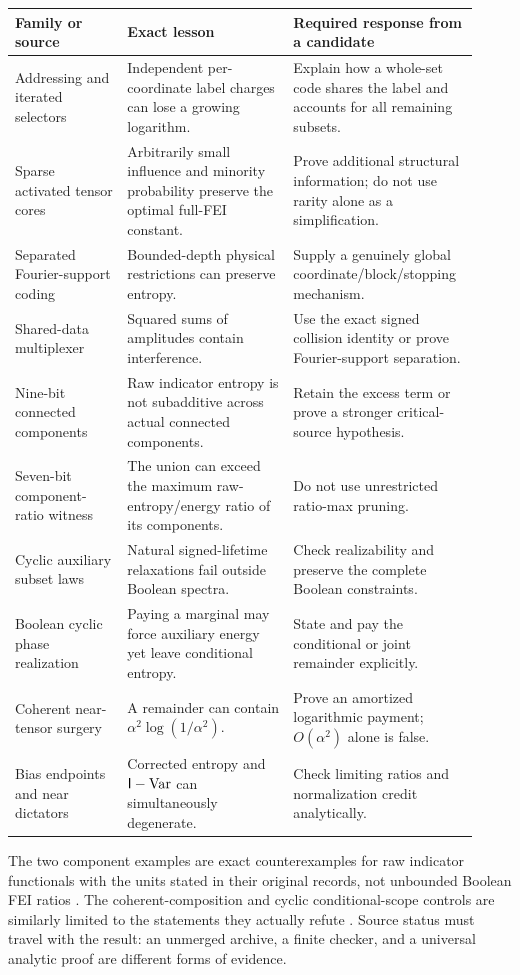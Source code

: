 \documentclass[11pt]{article}
\newcommand{\Var}{\operatorname{Var}}\newcommand{\wh}[1]{\widehat{#1}}
\begin{document}
\begin{longtable}{>{\raggedright\arraybackslash}p{0.23\linewidth}>{\raggedright\arraybackslash}p{0.34\linewidth}>{\raggedright\arraybackslash}p{0.35\linewidth}}
\toprule
Family or source & Exact lesson & Required response from a candidate \\
\midrule\endhead
Addressing and iterated selectors & Independent per-coordinate label charges can lose a growing logarithm. & Explain how a whole-set code shares the label and accounts for all remaining subsets. \\
Sparse activated tensor cores & Arbitrarily small influence and minority probability preserve the optimal full-FEI constant. & Prove additional structural information; do not use rarity alone as a simplification. \\
Separated Fourier-support coding & Bounded-depth physical restrictions can preserve entropy. & Supply a genuinely global coordinate/block/stopping mechanism. \\
Shared-data multiplexer & Squared sums of amplitudes contain interference. & Use the exact signed collision identity or prove Fourier-support separation. \\
Nine-bit connected components & Raw indicator entropy is not subadditive across actual connected components. & Retain the excess term or prove a stronger critical-source hypothesis. \\
Seven-bit component-ratio witness & The union can exceed the maximum raw-entropy/energy ratio of its components. & Do not use unrestricted ratio-max pruning. \\
Cyclic auxiliary subset laws & Natural signed-lifetime relaxations fail outside Boolean spectra. & Check realizability and preserve the complete Boolean constraints. \\
Boolean cyclic phase realization & Paying a marginal may force auxiliary energy yet leave conditional entropy. & State and pay the conditional or joint remainder explicitly. \\
Coherent near-tensor surgery & A remainder can contain $\alpha^2\log(1/\alpha^2)$. & Prove an amortized logarithmic payment; $O(\alpha^2)$ alone is false. \\
Bias endpoints and near dictators & Corrected entropy and $\I-\Var$ can simultaneously degenerate. & Check limiting ratios and normalization credit analytically. \\
\bottomrule
\end{longtable}

The two component examples are exact counterexamples for raw indicator functionals with the units stated in their original records, not unbounded Boolean FEI ratios \cite{Brain44,Brain45}. The coherent-composition and cyclic conditional-scope controls are similarly limited to the statements they actually refute \cite{Brain54}. Source status must travel with the result: an unmerged archive, a finite checker, and a universal analytic proof are different forms of evidence.
\end{document}
